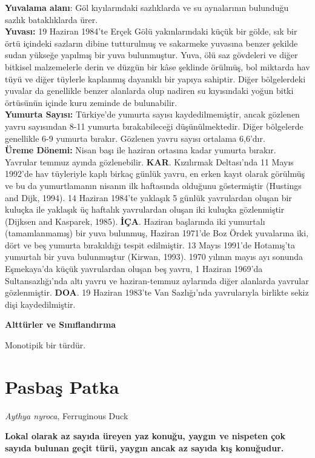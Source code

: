 \documentclass[
  a4paper,
  DIV=11,
  numbers=noendperiod]{scrartcl}
\begin{document}
\textbf{Yuvalama alanı}: Göl kıyılarındaki sazlıklarda ve su aynalarının
bulunduğu sazlık bataklıklarda ürer.\\
\textbf{Yuvası:} 19 Haziran 1984'te Erçek Gölü yakınlarındaki küçük bir
gölde, sık bir örtü içindeki sazların dibine tutturulmuş ve sakarmeke
yuvasına benzer şekilde sudan yükseğe yapılmış bir yuva bulunmuştur.
Yuva, ölü saz gövdeleri ve diğer bitkisel malzemelerle derin ve düzgün
bir kâse şeklinde örülmüş, bol miktarda hav tüyü ve diğer tüylerle
kaplanmış dayanıklı bir yapıya sahiptir. Diğer bölgelerdeki yuvalar da
genellikle benzer alanlarda olup nadiren su kıyısındaki yoğun bitki
örtüsünün içinde kuru zeminde de bulunabilir.\\
\textbf{Yumurta Sayısı:} Türkiye'de yumurta sayısı kaydedilmemiştir,
ancak gözlenen yavru sayısından 8-11 yumurta bırakabileceği
düşünülmektedir. Diğer bölgelerde genellikle 6-9 yumurta bırakır.
Gözlenen yavru sayısı ortalama 6,6'dır.\\
\textbf{Üreme Dönemi:} Nisan başı ile haziran ortasına kadar yumurta
bırakır. Yavrular temmuz ayında gözlenebilir. \textbf{KAR}. Kızılırmak
Deltası'nda 11 Mayıs 1992'de hav tüyleriyle kaplı birkaç günlük yavru,
en erken kayıt olarak görülmüş ve bu da yumurtlamanın nisanın ilk
haftasında olduğunu göstermiştir (Hustings and Dijk, 1994). 14 Haziran
1984'te yaklaşık 5 günlük yavrulardan oluşan bir kuluçka ile yaklaşık üç
haftalık yavrulardan oluşan iki kuluçka gözlenmiştir (Dijksen and
Kasparek, 1985). \textbf{İÇA}. Haziran başlarında iki yumurtalı
(tamamlanmamış) bir yuva bulunmuş, Haziran 1971'de Boz Ördek yuvalarına
iki, dört ve beş yumurta bırakıldığı tespit edilmiştir. 13 Mayıs 1991'de
Hotamış'ta yumurtalı bir yuva bulunmuştur (Kirwan, 1993). 1970 yılının
mayıs ayı sonunda Eşmekaya'da küçük yavrulardan oluşan beş yavru, 1
Haziran 1969'da Sultansazlığı'nda altı yavru ve haziran-temmuz aylarında
diğer alanlarda yavrular gözlenmiştir. \textbf{DOA}. 19 Haziran 1983'te
Van Sazlığı'nda yavrularıyla birlikte sekiz dişi kaydedilmiştir.

\textbf{Alttürler ve Sınıflandırma}

Monotipik bir türdür.

\section{Pasbaş Patka}\label{pasbaux15f-patka}

\emph{Aythya nyroca}, Ferruginous Duck

\textbf{Lokal olarak az sayıda üreyen yaz konuğu, yaygın ve nispeten çok
sayıda bulunan geçit türü, yaygın ancak az sayıda kış konuğudur.}
\end{document}

